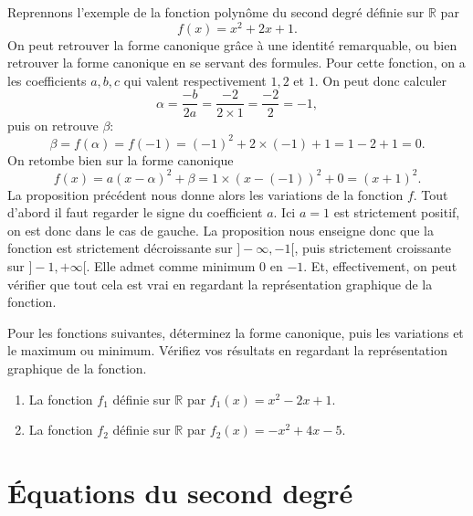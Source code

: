 \documentclass[11pt]{article}
\begin{document}
\begin{exemple}
  Reprennons l'exemple de la fonction polynôme du second degré définie sur
  $\mathbb{R}$ par
  \[
    f(x) = x^2+2x+1.
  \]
  On peut retrouver la forme canonique gr\^ace à une identité remarquable, ou
  bien retrouver la forme canonique en se servant des formules. Pour cette
  fonction, on a les coefficients $a, b, c$ qui valent respectivement $1, 2$ et
  $1$. On peut donc calculer
  \[
    \alpha =\frac{-b}{2a}=\frac{-2}{2\times 1} = \frac{-2}{2} = -1,
  \]
  puis on retrouve $\beta$:
  \[
    \beta = f(\alpha) = f(-1) = (-1)^2+2\times(-1)+1 = 1 - 2 + 1 = 0.
  \]
  On retombe bien sur la forme canonique
  \[
    f(x) = a(x-\alpha)^2+\beta = 1\times(x-(-1))^2+0=(x+1)^2.
  \]
  La proposition précédent nous donne alors les variations de la fonction $f$.
  Tout d'abord il faut regarder le signe du coefficient $a$. Ici $a=1$ est
  strictement positif, on est donc dans le cas de gauche. La proposition nous
enseigne donc que la fonction est strictement décroissante sur $]-\infty, -1[$,
puis strictement croissante sur $]-1, +\infty[$. Elle admet comme minimum $0$
    en $-1$. Et, effectivement, on peut vérifier que tout cela est vrai en
    regardant la représentation graphique de la fonction.
 \begin{center}
\end{center}
\end{exemple}

\begin{exo}
  Pour les fonctions suivantes, déterminez la forme canonique, puis les
  variations et le maximum ou minimum. Vérifiez vos résultats en regardant la
  représentation graphique de la fonction.
  \begin{enumerate}
    \item La fonction $f_1$ définie sur $\mathbb{R}$ par $f_1(x)=x^2-2x+1$.
    \item La fonction $f_2$ définie sur $\mathbb{R}$ par $f_2(x)=-x^2+4x-5$.
  \end{enumerate}
\end{exo}

\section{Équations du second degré}
\end{document}
